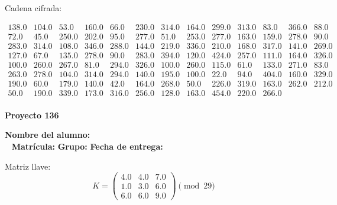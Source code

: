 \documentclass[12pt]{article}
\begin{document}
Cadena cifrada:
\begin{center}
$\begin{array}{lllllllllllll}
138.0 & 104.0 & 53.0 & 160.0 & 66.0 & 230.0 & 314.0 & 164.0 & 299.0 & 313.0 & 83.0 & 366.0 & 88.0\\
72.0 & 45.0 & 250.0 & 202.0 & 95.0 & 277.0 & 51.0 & 253.0 & 277.0 & 163.0 & 159.0 & 278.0 & 90.0\\
283.0 & 314.0 & 108.0 & 346.0 & 288.0 & 144.0 & 219.0 & 336.0 & 210.0 & 168.0 & 317.0 & 141.0 & 269.0\\
127.0 & 67.0 & 135.0 & 278.0 & 90.0 & 283.0 & 394.0 & 120.0 & 424.0 & 257.0 & 111.0 & 164.0 & 326.0\\
100.0 & 260.0 & 267.0 & 81.0 & 294.0 & 326.0 & 100.0 & 260.0 & 115.0 & 61.0 & 133.0 & 271.0 & 83.0\\
263.0 & 278.0 & 104.0 & 314.0 & 294.0 & 140.0 & 195.0 & 100.0 & 22.0 & 94.0 & 404.0 & 160.0 & 329.0\\
190.0 & 60.0 & 179.0 & 140.0 & 42.0 & 164.0 & 268.0 & 50.0 & 226.0 & 319.0 & 163.0 & 262.0 & 212.0\\
50.0 & 190.0 & 339.0 & 173.0 & 316.0 & 256.0 & 128.0 & 163.0 & 454.0 & 220.0 & 266.0\\
\end{array}$
\end{center}

\newpage


\textbf{Proyecto 136}

\textbf{Nombre del alumno:} \underline{\hspace{13cm}}\\\
\vspace{1cm}
\textbf{Matrícula:} \underline{\hspace{4cm}} \hspace{1cm}
\textbf{Grupo:} \underline{\hspace{2cm}}
\textbf{Fecha de entrega:} \underline{\hspace{2cm}}

\medskip

Matriz llave:
\[
K = \begin{pmatrix}
4.0 & 4.0 & 7.0\\
1.0 & 3.0 & 6.0\\
6.0 & 6.0 & 9.0
\end{pmatrix} \pmod{29}
\]
\end{document}

